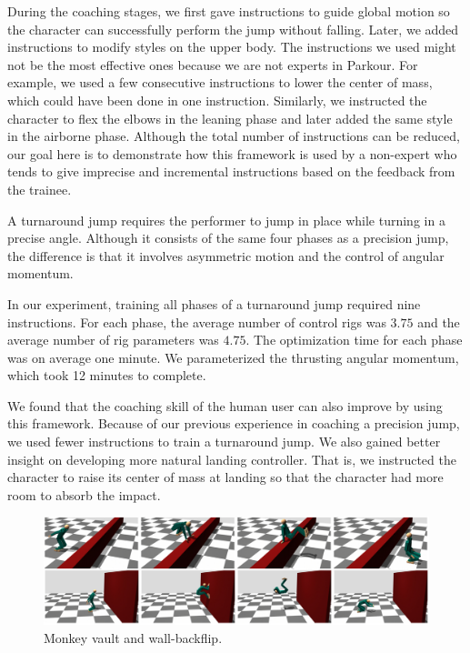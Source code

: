 During the coaching stages, we first gave instructions to guide global
motion so the character can successfully perform the jump
without falling. Later, we added instructions to modify styles on the
upper body. The instructions we used might not be the most effective
ones because we are not experts in Parkour. For example, we used a few
consecutive instructions to lower the center of mass, which could have
been done in one instruction. Similarly, we instructed the character
to flex the elbows in the leaning phase and later added the same style in
the airborne phase. Although the total number of instructions can be
reduced, our goal here is to demonstrate how this framework is used by
a non-expert who tends to give imprecise and incremental instructions
based on the feedback from the trainee.


A turnaround jump requires the performer to jump in place while
turning in a precise angle. Although it consists of the same four phases
as a precision jump, the difference is that it involves asymmetric
motion and the control of angular momentum.

In our experiment, training all phases of a turnaround jump required
nine instructions. For each phase, the average number of control rigs
was $3.75$ and the average number of rig parameters was $4.75$. The
optimization time for each phase was on average one minute. We
parameterized the thrusting angular momentum, which took 12 minutes to
complete.

We found that the coaching skill of the human user can also improve by
using this framework. Because of our previous experience in coaching a
precision jump, we used fewer instructions to train a turnaround
jump. We also gained better insight on developing more natural landing
controller. That is, we instructed the character to raise its center
of mass at landing so that the character had more room to absorb the
impact.

\begin{figure}[htbp]
\center
  \includegraphics[width=0.95\linewidth]{images/results}
  \caption{
    Monkey vault and wall-backflip.
  }
  \label{fig:parkour_results}
\end{figure}

